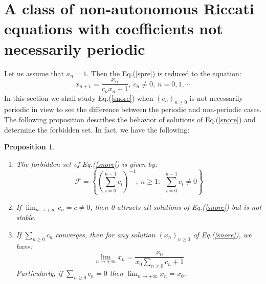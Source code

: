 \documentclass[11pt]{amsart}
\newtheorem{prop}[thm]{Proposition}
\theoremstyle{definition}
\theoremstyle{remark}
\theoremstyle{example}
\numberwithin{equation}{section}
\begin{document}
\section{\bf A class of non-autonomous Riccati equations with coefficients not necessarily periodic }
Let us assume that $a_n=1$. Then the Eq.(\ref{spre}) is reduced to the equation:
\begin{equation}
x_{n+1}=\frac{x_n}{c_nx_n+1}, \ c_n\neq0, \ n=0,1,\cdots \label{snore}
\end{equation}
In this section we shall study Eq.(\ref{snore}) when $(c_n)_{n\geq0}$ is not necessarily periodic in view to see the difference between the periodic and non-periodic cases. The following proposition describes the behavior of solutions of Eq.(\ref{snore}) and determine the forbidden set.
In fact, we have the following:
\begin{prop}\rm{
\noindent
\begin{enumerate}[leftmargin=*]
\item The forbidden set of Eq.(\ref{snore}) is given by:
$$\mathcal{F}=\left\{\left(\sum\limits_{i=0}^{n-1}c_i\right)^{-1}; \ n\geq1: \
\ \sum\limits_{i=0}^{n-1}c_i\neq0\right\}$$
\item If $\displaystyle{\lim_{n\rightarrow+\infty}c_n=c\neq0}$, then 0 attracts all solutions of Eq.(\ref{snore}) but is not stable.
\vspace{3mm}
\item If $\sum\limits_{n\geq0}c_n$ converges, then for any solution $(x_n)_{n\geq0}$ of Eq.(\ref{snore}), we have:
    $$\lim_{n\rightarrow+\infty}x_n=\frac{x_0}{x_0\sum\limits_{n\geq0}c_n+1}$$
    Particularly, if $\sum\limits_{n\geq0}c_n=0$ then $\displaystyle{\lim_{n\rightarrow+\infty}x_n=x_0}$.
\end{enumerate}
}\end{prop}
\medskip
\end{document}
